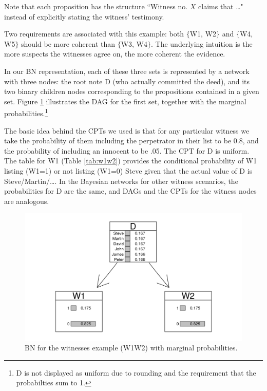 \documentclass[10pt,]{scrartcl}
\begin{document}
\noindent Note that  each proposition has the structure ``Witness no.
\(X\) claims that \dots" instead of explicitly stating the witness'
testimony.

Two requirements are associated with this example: both
\(\{\)\textsf{W1, W2}\(\}\) and \(\{\)\textsf{W4, W5}\(\}\) should be
more coherent than \(\{\)\textsf{W3, W4}\(\}\).  The underlying intuition is the more suspects the witnesses agree on, the more coherent the evidence. 


In our BN representation, each of these three sets is represented by a network with three nodes: the root note \textsf{D} (who actually committed the deed), and its two binary children nodes corresponding to the propositions contained in a given set. Figure \ref{fig:witnessw1w2} illustrates the DAG for the first set, together with the marginal probabilities.\footnote{\textsf{D} is  not displayed as uniform due to rounding and the requirement that the probabilties sum to 1.}

The basic idea behind
the CPTs we used is that for any particular witness we take the
probability of them including the perpetrator in their list to be 0.8,
and the probability of including an innocent to be .05.  
The CPT for \textsf{D} is uniform. The table for \textsf{W1}  (Table \ref{tab:w1w2}) provides
the conditional probability of \textsf{W1} listing (\textsf{W1}=1) or
not listing (\textsf{W1}=0) Steve given that the actual
value of \textsf{D} is Steve/Martin/\dots.  In the
Bayesian networks for other witness scenarios, the probabilities for \textsf{D} are the same, and DAGs and  the CPTs for the witness nodes are analogous. 






\begin{figure}[h]
\centering
\includegraphics[width =14cm]{../images/w1w2BNv2.png}
\caption{BN for the witnesses example (W1W2) with marginal probabilities.}
\label{fig:witnessw1w2}
\end{figure}
\end{document}
